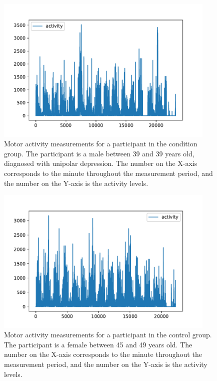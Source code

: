 \begin{figure}[h]
  \begin{center}
      \includegraphics[height=7cm]{img/activity_condition_1.pdf}
      \caption{Motor activity measurements for a participant in the condition group. The participant is a male between 39 and 39 years old, diagnosed with unipolar depression. The number on the X-axis corresponds to the minute throughout the measurement period, and the number on the Y-axis is the activity levels.}
      \label{figure:participant_activity}
  \end{center}
\end{figure}

\begin{figure}[h]
  \begin{center}
    \includegraphics[height=7cm]{img/activity_control_1.pdf}
    \caption{Motor activity measurements for a participant in the control group. The participant is a female between 45 and 49 years old. The number on the X-axis corresponds to the minute throughout the measurement period, and the number on the Y-axis is the activity levels.}
    \label{figure:participant_activity_control}
  \end{center}
\end{figure}

